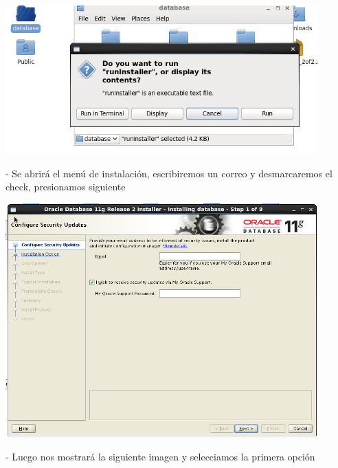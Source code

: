\documentclass[12pt,letterpaper]{article}
\begin{document}
\begin{center}
	\includegraphics[width=12cm]{./Imagenes/26} 
\end{center}

\begin{itemize}
- Se abrirá el menú de instalación, escribiremos un correo y desmarcaremos el check, presionamos siguiente \\
\end{itemize}

\begin{center}
	\includegraphics[width=12cm]{./Imagenes/27} 
\end{center}


\begin{itemize}
- Luego nos mostrará la siguiente imagen y selecciamos la primera opción  \\
\end{itemize}
\end{document}

